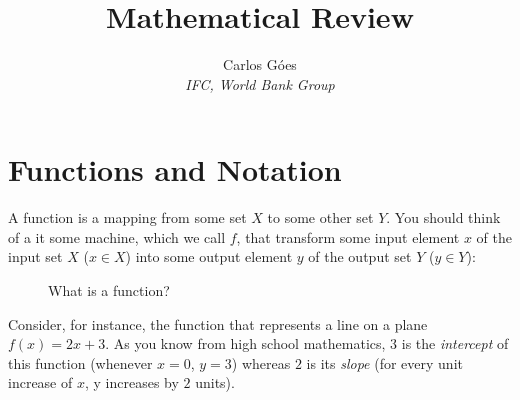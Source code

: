 \documentclass[11pt,letterpaper]{article}
\begin{document}
\title{\textbf{Mathematical Review}}
\author{\large%
\setcounter{footnote}{0}%
Carlos G\'{o}es \\[-3pt] \textit{\small IFC, World Bank Group}
}
\maketitle

\section*{Functions and Notation}

A function is a mapping from some set $X$ to some other set $Y$. You should think of a it some machine, which we call $f$, that transform some input element $x$ of the input set $X$ ($x \in X$) into some output element $y$ of the output set $Y$ ($y \in Y$):

\begin{figure}[htp]
    \centering
{}
    \caption{What is a function?}
    \label{fig:functions}
\end{figure}

Consider, for instance, the function that represents a line on a plane $f(x) = 2x + 3$. As you know from high school mathematics, $3$ is the \textit{intercept} of this function (whenever $x=0$, $y=3$) whereas $2$ is its \textit{slope} (for every unit increase of $x$, y increases  by $2$ units).

\end{document}

